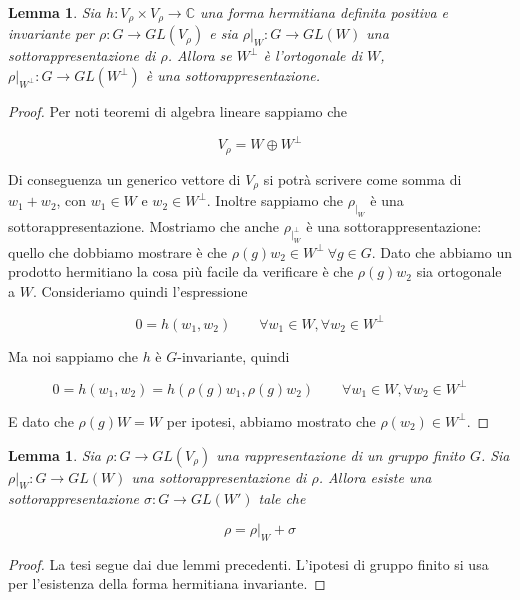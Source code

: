 \documentclass[11pt]{article}
\theoremstyle{plain}
\newtheorem{lemma}[thm]{Lemma}
\theoremstyle{definition}
\theoremstyle{remark}
\newcommand{\C}{\mathbb{C}}
\begin{document}
\begin{lemma}
Sia $h: V_\rho \times V_\rho \to \C$ una forma hermitiana definita positiva e invariante per $\rho: G \to GL(V_\rho)$ e sia $\rho|_W: G \to GL(W)$ una sottorappresentazione di $\rho$. Allora se $W^\perp$ è l'ortogonale di $W$, $\rho|_{W^\perp}: G \to GL(W^\perp)$ è una sottorappresentazione.

\end{lemma}

\begin{proof}

Per noti teoremi di algebra lineare sappiamo che

\[ V_\rho = W \oplus W^\perp \]

Di conseguenza un generico vettore di $V_\rho$ si potrà scrivere come somma di $w_1 + w_2$, con $w_1 \in W$ e $w_2 \in W^\perp$. Inoltre sappiamo che $\rho_{|_W}$ è una sottorappresentazione. Mostriamo che anche $\rho_{|_W^\perp}$ è una sottorappresentazione: quello che dobbiamo mostrare è che $\rho(g) w_2 \in W^\perp \ \forall g \in G$. Dato che abbiamo un prodotto hermitiano la cosa più facile da verificare è che $\rho(g) w_2$ sia ortogonale a $W$. Consideriamo quindi l'espressione

\[ 0 = h(w_1, w_2) \qquad \forall w_1 \in W, \forall w_2 \in W^\perp\]

Ma noi sappiamo che $h$ è $G$-invariante, quindi

\[ 0 = h(w_1, w_2) = h(\rho(g) w_1, \rho(g) w_2) \qquad \forall w_1 \in W, \forall w_2 \in W^\perp \]

E dato che $\rho(g) W = W$ per ipotesi, abbiamo mostrato che $\rho(w_2) \in W^\perp$.
\end{proof}




\begin{lemma}
Sia $\rho: G \to GL(V_\rho)$ una rappresentazione di un gruppo finito $G$. Sia $\rho|_W: G \to GL(W)$ una sottorappresentazione di $\rho$. Allora esiste una sottorappresentazione $\sigma: G \to GL(W')$ tale che

\[\rho = \rho|_W + \sigma \]
\end{lemma}


\begin{proof} La tesi segue dai due lemmi precedenti. L'ipotesi di gruppo finito si usa per l'esistenza della forma hermitiana invariante.
\end{proof}
\end{document}
